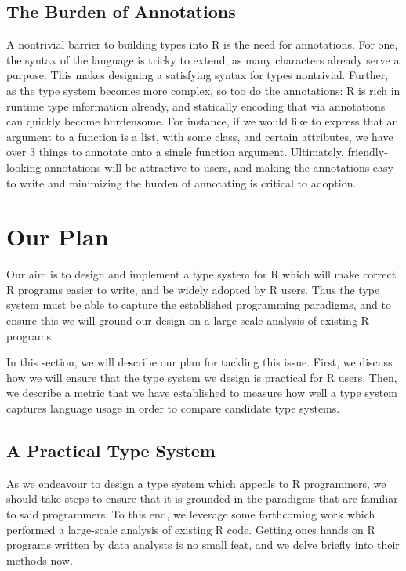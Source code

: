 \documentclass[sigplan,10pt,review,anonymous]{acmart}\settopmatter{printfolios=true,printccs=false,printacmref=false}
\begin{document}
%
%
\subsection{The Burden of Annotations}

A nontrivial barrier to building types into R is the need for annotations.
For one, the syntax of the language is tricky to extend, as many characters already serve a purpose.
This makes designing a satisfying syntax for types nontrivial.
Further, as the type system becomes more complex, so too do the annotations:
R is rich in runtime type information already, and statically encoding that via annotations can quickly become burdensome.
For instance, if we would like to express that an argument to a function is a list, with some class, and certain attributes, we have over 3 things to annotate onto a single function argument.
Ultimately, friendly-looking annotations will be attractive to users, and making the annotations easy to write and minimizing the burden of annotating is critical to adoption.

%
%
%
%
\section{Our Plan}
\label{sec:plan}

Our aim is to design and implement a type system for R which will make correct R programs easier to write, and be widely adopted by R users.
Thus the type system must be able to capture the established programming paradigms, and to ensure this we will ground our design on a large-scale analysis of existing R programs.

In this section, we will describe our plan for tackling this issue.
First, we discuss how we will ensure that the type system we design is practical for R users.
Then, we describe a metric that we have established to measure how well a type system captures language usage in order to compare candidate type systems.

%
%
\subsection{A Practical Type System}
\label{sec:practicalTS}

As we endeavour to design a type system which appeals to R programmers, we should take steps to ensure that it is grounded in the paradigms that are familiar to said programmers.
To this end, we leverage some forthcoming work which performed a large-scale analysis of existing R code.
Getting ones hands on R programs written by data analysts is no small feat, and we delve briefly into their methods now.
\end{document}
